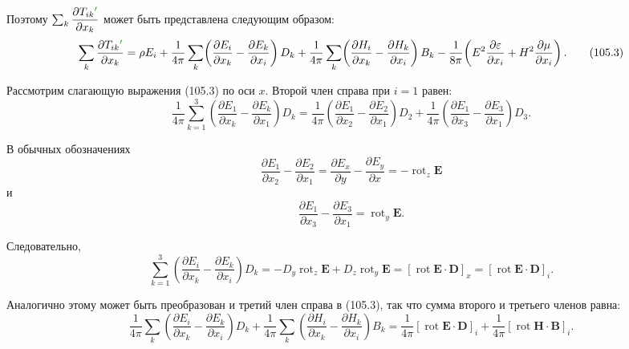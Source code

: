 \documentclass[a4paper,10pt]{article}
\newcommand{\modtext}[1]{\textcolor{modcolor}{#1}}
\newcommand{\modmath}[1]{\textcolor{modcolor}{#1}}
\begin{document}
Поэтому $\sum_k\dfrac{\partial T_{ik}\modmath{'}}{\partial x_k}$ может быть
представлена следующим образом:
\begin{equation}
    \sum_k\frac{\partial T_{ik}\modmath{'}}{\partial x_k}
    = \rho E_i + \frac{1}{4\pi}\sum_k\!\left(
        \frac{\partial E_i}{\partial x_k} - \frac{\partial E_k}{\partial x_i}
    \right)D_k
    + \frac{1}{4\pi}\sum_k\!\left(
        \frac{\partial H_i}{\partial x_k} - \frac{\partial H_k}{\partial x_i}
    \right)B_k
    - \frac{1}{8\pi}\!\left(
        E^2\frac{\partial\varepsilon}{\partial x_i}
      + H^2\frac{\partial\mu}{\partial x_i}
    \right).
    \tag{105.3}
\end{equation}


Рассмотрим слагающую выражения (105.3) по оси $x$. Второй член справа
при $i = 1$ равен:
$$
    \frac{1}{4\pi}\sum_{k=1}^3\!\left(
        \frac{\partial E_1}{\partial x_k} - \frac{\partial E_k}{\partial x_1}
    \right)D_k
    = \frac{1}{4\pi}\!\left(
        \frac{\partial E_1}{\partial x_2} - \frac{\partial E_2}{\partial x_1}
    \right)D_2
    + \frac{1}{4\pi}\!\left(
        \frac{\partial E_1}{\partial x_3} - \frac{\partial E_3}{\partial x_1}
    \right)D_3.
$$


В обычных обозначениях
$$
    \frac{\partial E_1}{\partial x_2} - \frac{\partial E_2}{\partial x_1}
    = \frac{\partial E_x}{\partial y} - \frac{\partial E_y}{\partial x}
    = -\operatorname{rot}_z\mathbf{E}
$$
и
$$
    \frac{\partial E_1}{\partial x_3} - \frac{\partial E_3}{\partial x_1}
    = \operatorname{rot}_y\mathbf{E}.
$$

Следовательно,
$$
    \sum_{k=1}^3\!\left(
        \frac{\partial E_i}{\partial x_k} - \frac{\partial E_k}{\partial x_i}
    \right)D_k
    = -D_y\operatorname{rot}_z\mathbf{E} + D_z\operatorname{rot}_y\mathbf{E}
    = [\operatorname{rot}\mathbf{E}\cdot\mathbf{D}]_x
    = [\operatorname{rot}\mathbf{E}\cdot\mathbf{D}]_i.
$$

Аналогично этому может быть преобразован и третий член справа в (105.3),
так что сумма второго и третьего членов равна:
$$
    \frac{1}{4\pi}\sum_k\!\left(
        \frac{\partial E_i}{\partial x_k} - \frac{\partial E_k}{\partial x_i}
    \right)D_k
    + \frac{1}{4\pi}\sum_k\!\left(
        \frac{\partial H_i}{\partial x_k} - \frac{\partial H_k}{\partial x_i}
    \right)B_k
    = \frac{1}{4\pi}[\operatorname{rot}\mathbf{E}\cdot\mathbf{D}]_i
    + \frac{1}{4\pi}[\operatorname{rot}\mathbf{H}\cdot\mathbf{B}]_i.
$$
\end{document}
